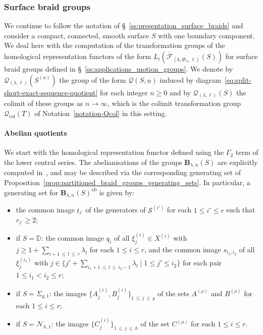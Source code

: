 \documentclass[AHL,Unicode,published]{cedram}
\newcommand{\ab}{\mathrm{ab}}
\newcommand{\Int}{\mathring}
\newcommand{\col}{\mathrm{col}}
\newcommand{\B}{\ensuremath{\mathbf{B}}}
\newcommand{\LCS}{\varGamma}
\newcommand{\Sym}{\mathfrak{S}}
\newcommand{\sS}{\mathscr{S}}
\newcommand{\N}{\mathscr{N}}
\newcommand{\cF}{\mathcal{F}}
\newcommand{\cQ}{\mathcal{Q}}
\newcommand{\bD}{\mathbb{D}}
\renewcommand{\geq}{\geqslant}
\renewcommand{\leq}{\leqslant}
\begin{document}
\subsubsection{Surface braid groups}\label{ss:surface_braid_transformation_groups}

We continue to follow the notation of \S~\ref{ss:presentation_surface_braids} and consider a compact, connected, smooth surface $S$ with one boundary component. We deal here with the computation of the transformation groups of the homological representation functors of the form $L_{i}(\Int{\cF}_{(\underline{k},\Sym_{\lambda},\ell)}(S))$ for surface braid groups defined in \S~\ref{ss:applications_motion_groups}. We denote by $\cQ_{(\lambda,\ell)}(S^{(n)})$ the group of the form $\cQ(S,\underline{n})$ induced by diagram~\eqref{eq:split-short-exact-sequence-quotient} for each integer $n \geq 0$ and by $\cQ_{(\lambda,\ell)}(S)$ the colimit of these groups as $n\to\infty$, which is the colimit transformation group $\cQ_{\col}(T)$ of Notation~\ref{notation-Qcol} in this setting.


\paragraph*{Abelian quotients}
We start with the homological representation functor defined using the $\LCS_{2}$ term of the lower central series. The abelianisations of the groups $\B_{\lambda,n}(S)$ are explicitly computed in~\cite[Props.~3.5 and 6.47]{DPS}, and may be described via the corresponding generating set of Proposition~\ref{prop:partitioned_braid_groups_generating_sets}. In particular, a generating set for $\B_{\lambda,n}(S)^{\ab}$ is given by:
\begin{itemize}
\item the common image $t_{i'}$ of the generators of $\sS^{(i')}$ for each $1\leq i'\leq r$ such that $r_{i'}\geq 2$;
\item if $S=\bD$: the common image $q_{i}$ of all $\xi_{j}^{(i)}\in X^{(i)}$ with $j\geq 1+\sum_{i+1\,\leq\,l\,\leq\,r}\lambda_{l}$ for each $1\leq i\leq r$, and the common image $s_{i_{1},i_{2}}$ of all $\xi_{j}^{(i_{1})}$ with $j\in \{j'+\sum_{i_{1}+1\,\leq\,l\,\leq\,i_{2}-1}\lambda_{l}\mid 1\leq j'\leq i_{2}\}$ for each pair $1\leq i_{1}< i_{2}\leq r$;
\item if $S=\Sigma_{g,1}$: the images $\{ A_{j}^{(i)},B_{j}^{(i)}\} _{1\,\leq\,j\,\leq\,g}$ of the sets $A^{(\rho)}$ and $B^{(\rho)}$ for each $1\leq i\leq r$;
\item if $S=\N_{h,1}$: the images $\{ C_{j}^{(i)}\} _{1\,\leq\,j\,\leq\,h}$ of the set $C^{(\rho)}$ for each $1\leq i\leq r$.
\end{itemize}
\end{document}
